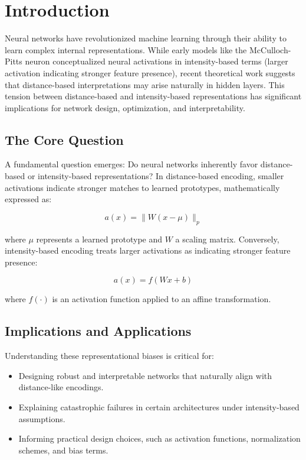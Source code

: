 \section{Introduction}

Neural networks have revolutionized machine learning through their ability to learn complex internal representations. While early models like the McCulloch-Pitts neuron conceptualized neural activations in intensity-based terms (larger activation indicating stronger feature presence), recent theoretical work suggests that distance-based interpretations may arise naturally in hidden layers. This tension between distance-based and intensity-based representations has significant implications for network design, optimization, and interpretability.

\subsection{The Core Question}

A fundamental question emerges: Do neural networks inherently favor distance-based or intensity-based representations? In distance-based encoding, smaller activations indicate stronger matches to learned prototypes, mathematically expressed as:

\begin{equation}
    a(x) = \|W(x - \mu)\|_p
\end{equation}

where $\mu$ represents a learned prototype and $W$ a scaling matrix. Conversely, intensity-based encoding treats larger activations as indicating stronger feature presence:

\begin{equation}
    a(x) = f(Wx + b)
\end{equation}

where $f(\cdot)$ is an activation function applied to an affine transformation.

\subsection{Implications and Applications}

Understanding these representational biases is critical for:

\begin{itemize}
    \item Designing robust and interpretable networks that naturally align with distance-like encodings.
    \item Explaining catastrophic failures in certain architectures under intensity-based assumptions.
    \item Informing practical design choices, such as activation functions, normalization schemes, and bias terms.
\end{itemize}

